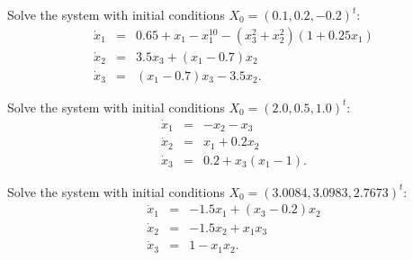 \begin{exercise}  \label{c11.6.1g} 
Solve the system  with initial conditions 
$X_0 = (0.1,0.2, -0.2)^t$:
\begin{equation*} \label{e11.6.1g}
\begin{array}{rcl} 
\dot{x}_1 & = & 0.65 + x_1 - x_1^{10} - (x_3^2 + x_2^2)(1 + 0.25x_1)  \\
\dot{x}_2 & = & 3.5x_3 + (x_1 - 0.7)x_2  \\
\dot{x}_3 & = & (x_1 - 0.7)x_3 - 3.5x_2.
\end{array}
\end{equation*}
\end{exercise}

\begin{exercise}  \label{c11.6.1f}
Solve the system  with initial conditions 
$X_0 = (2.0, 0.5, 1.0)^t$:
\begin{equation*} \label{e11.6.1f}
\begin{array}{rcl} 
\dot{x}_1 & = & -x_2-x_3  \\
\dot{x}_2 & = &  x_1 + 0.2x_2 \\
\dot{x}_3 & = & 0.2 + x_3(x_1 - 1). \end{array}
\end{equation*}
\end{exercise}

\begin{exercise}  \label{c11.6.1h} 
Solve the system  with initial conditions 
$X_0 = (3.0084, 3.0983, 2.7673)^t$: 
\begin{equation*} \label{e11.6.1h}
\begin{array}{rcl} 
\dot{x}_1 & = &  -1.5x_1 + (x_3-0.2)x_2 \\
\dot{x}_2 & = &  -1.5x_2 + x_1x_3\\
\dot{x}_3 & = &  1 - x_1x_2.
\end{array}
\end{equation*}
\end{exercise}
